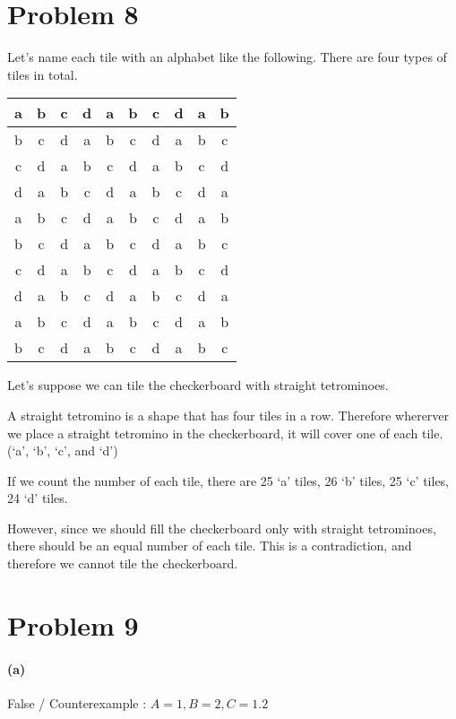 \documentclass[10pt]{article}
\begin{document}
\section*{Problem 8} 
Let's name each tile with an alphabet like the following. There are four types of tiles in total.
\begin{table}[H]
  \centering
  \renewcommand{\arraystretch}{1.2}
  \begin{tabular}{|c|c|c|c|c|c|c|c|c|c|}
    \hline
    a&b&c&d&a&b&c&d&a&b \\ \hline
    b&c&d&a&b&c&d&a&b&c \\ \hline
    c&d&a&b&c&d&a&b&c&d \\ \hline
    d&a&b&c&d&a&b&c&d&a \\ \hline
    a&b&c&d&a&b&c&d&a&b \\ \hline
    b&c&d&a&b&c&d&a&b&c \\ \hline
    c&d&a&b&c&d&a&b&c&d \\ \hline
    d&a&b&c&d&a&b&c&d&a \\ \hline
    a&b&c&d&a&b&c&d&a&b \\ \hline
    b&c&d&a&b&c&d&a&b&c \\ \hline
  \end{tabular}
\end{table}
Let's suppose we can tile the checkerboard with straight tetrominoes.

\vspace{0.3cm} A straight tetromino is a shape that has four tiles in a row. 
Therefore whererver we place a straight tetromino in the checkerboard, it will cover one of each tile. (`a', `b', `c', and `d')

\vspace{0.3cm} If we count the number of each tile, there are 25 `a' tiles, 26 `b' tiles, 25 `c' tiles, 24 `d' tiles.

\vspace{0.3cm} However, since we should fill the checkerboard only with straight tetrominoes, there should be an equal number of each tile.
This is a contradiction, and therefore we cannot tile the checkerboard.

\section*{Problem 9}
\setcounter{equation}{0}
\paragraph{(a)} False / Counterexample : $A = \qty{1}, B = \qty{2}, C = \qty{1, 2}$
\end{document}
